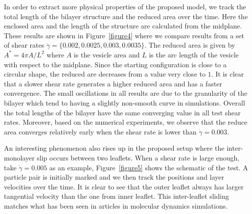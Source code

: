 \documentclass[lineno]{jfm}
\begin{document}
In order to extract more physical properties of the proposed model, we track the total length of the bilayer structure and the reduced area over the time. Here the enclosed area and the length of the structure are calculated from the midplane. 
These results are shown in Figure~\ref{figure4} where we compare results from a set of shear rates $\dot\gamma=\{0.002,0.0025,0.003,0.0035\}$. 
The reduced area is given by $A^* = 4\pi A/L^2$ where $A$ is the vesicle area and $L$ is the arc length of the vesicle with respect to the midplane. Since the starting configuration is close to a circular shape, the reduced are decreases from a value very close to $1$. It is clear that a slower shear rate generates a higher reduced area and has a faster convergence. The small oscillations in all results are due to the granularity of the bilayer which tend to having a slightly non-smooth curve in simulations. Overall the total lengths of the bilayer have the same converging value in all test shear rates. Moreover, based on the 
numerical experiments, we observe that the reduce area converges relatively early when the shear rate is lower than $\dot\gamma=0.003$. 

An interesting phenomenon also rises up in the proposed setup where the inter-monolayer slip occurs 
between two leaflets. When a shear rate is large enough, take $\dot\gamma = 0.005$ as an example, 
Figure~\ref{figure5} shows the schematic of the test. A particle pair is initially marked and we then track the positions and layer velocities over the time. It is clear to see that the outer leaflet always has larger 
tangential velocity than the one from inner leaflet. This inter-leaflet sliding matches what has been seen
in articles in molecular dynamics simulations. %
\end{document}
